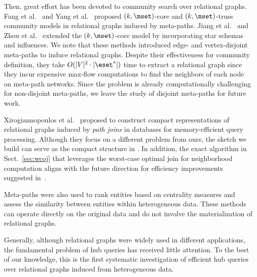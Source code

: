 Then, great effort \cite{fang2020effective, yang2020effective, jiang2022effective, ZhouFLY23} has been devoted to community search over relational graphs.
Fang et al.~\cite{fang2020effective} and Yang et al.~\cite{yang2020effective} proposed $(k, \mset)$-core and $(k, \mset)$-truss community models in relational graphs induced by meta-paths.
Jiang et al.~\cite{jiang2022effective} and Zhou et al.~\cite{ZhouFLY23} extended the $(k, \mset)$-core model by incorporating star schemas and influences.
We note that these methods introduced edge- and vertex-disjoint meta-paths to induce relational graphs.
Despite their effectiveness for community definition, they take $O(|V|^2 \cdot |\eset^*|)$ time to extract a relational graph since they incur expensive max-flow computations to find the neighbors of each node on meta-path networks.
Since the \ced problem is already computationally challenging for non-disjoint meta-paths, we leave the study of disjoint meta-paths for future work.

Xirogiannopoulos et al.~\cite{xirogiannopoulos2017extracting} proposed to construct compact representations of relational graphs induced by \emph{path joins} in databases for memory-efficient query processing. Although they focus on a different problem from ours, the sketch we build can serve as the compact structure in \cite{xirogiannopoulos2017extracting}. In addition, the exact algorithm in Sect.~\ref{sec:wcoj} that leverages the worst-case optimal join for neighborhood computation aligns with the future direction for efficiency improvements suggested in~\cite{xirogiannopoulos2017extracting}.

Meta-paths were also used to rank entities based on centrality measures \cite{10.1145/2020408.2020594, LEE2013684, ShiLYW16} and assess the similarity between entities \cite{sun2011pathsim, xiong2014top, shi2014hetesim, wang2016relsim} within heterogeneous data.
These methods can operate directly on the original data and do not involve the materialization of relational graphs.

Generally, although relational graphs were widely used in different applications, the fundamental problem of hub queries has received little attention. To the best of our knowledge, this is the first systematic investigation of efficient hub queries over relational graphs induced from heterogeneous data.

